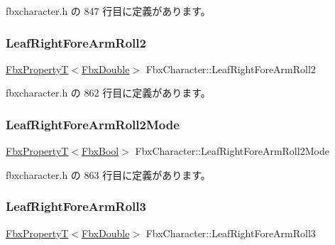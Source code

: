  fbxcharacter.\+h の 847 行目に定義があります。

\mbox{\label{class_fbx_character_a664e5dc50594ae77d3890192e9d2974e}} 
\subsubsection{\texorpdfstring{Leaf\+Right\+Fore\+Arm\+Roll2}{LeafRightForeArmRoll2}}
{\footnotesize\ttfamily \hyperlink{class_fbx_property_t}{Fbx\+PropertyT}$<$\hyperlink{fbxtypes_8h_a171e72a1c46fc15c1a6c9c31948c1c5b}{Fbx\+Double}$>$ Fbx\+Character\+::\+Leaf\+Right\+Fore\+Arm\+Roll2}



 fbxcharacter.\+h の 862 行目に定義があります。

\mbox{\label{class_fbx_character_a518adb669169224767225c1e8a673f32}} 
\subsubsection{\texorpdfstring{Leaf\+Right\+Fore\+Arm\+Roll2\+Mode}{LeafRightForeArmRoll2Mode}}
{\footnotesize\ttfamily \hyperlink{class_fbx_property_t}{Fbx\+PropertyT}$<$\hyperlink{fbxtypes_8h_a92e0562b2fe33e76a242f498b362262e}{Fbx\+Bool}$>$ Fbx\+Character\+::\+Leaf\+Right\+Fore\+Arm\+Roll2\+Mode}



 fbxcharacter.\+h の 863 行目に定義があります。

\mbox{\label{class_fbx_character_a29c4de5bb0939a59979f24f9ee72b3c9}} 
\subsubsection{\texorpdfstring{Leaf\+Right\+Fore\+Arm\+Roll3}{LeafRightForeArmRoll3}}
{\footnotesize\ttfamily \hyperlink{class_fbx_property_t}{Fbx\+PropertyT}$<$\hyperlink{fbxtypes_8h_a171e72a1c46fc15c1a6c9c31948c1c5b}{Fbx\+Double}$>$ Fbx\+Character\+::\+Leaf\+Right\+Fore\+Arm\+Roll3}



